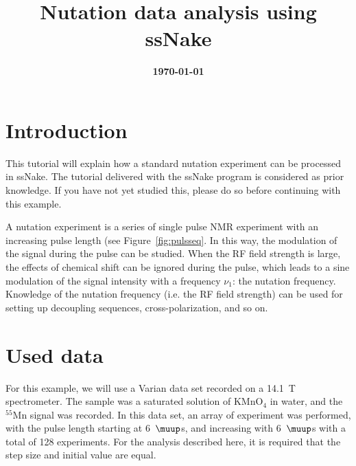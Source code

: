 \documentclass[11pt,a4paper]{article}
\title{\color{black}\fontfamily{SourceSansPro-LF}\bfseries Nutation data analysis using ssNake}
\date{\color{black}\fontfamily{SourceSansPro-LF}\bfseries \today}
\begin{document}


\maketitle

\section{Introduction}
This tutorial will explain how a standard nutation experiment can be processed in ssNake.
The tutorial delivered with the ssNake program is considered as prior knowledge.
If you have not yet studied this, please do so before continuing with this example.

A nutation experiment is a series of single pulse NMR experiment with an increasing pulse length (see Figure~\ref{fig:pulsseq}.
In this way, the modulation of the signal during the pulse can be studied.
When the RF field strength is large, the effects of chemical shift can be ignored during the pulse, which leads to a sine modulation of the signal intensity with a frequency $\nu_1$: the nutation frequency.
Knowledge of the nutation frequency (i.e. the RF field strength) can be used for setting up decoupling sequences, cross-polarization, and so on.

\begin{center}
\label{fig:pulsseq}
\end{center}




\section{Used data}
For this example, we will use a Varian data set recorded on a 14.1~T spectrometer.
The sample was a saturated solution of KMnO$_4$ in water, and the $^{55}$Mn signal was recorded.
In this data set, an array of experiment was performed, with the pulse length starting at 6~$\muup$s, and increasing with 6~$\muup$s with a total of 128 experiments.
For the analysis described here, it is required that the step size and initial value are equal.
\end{document}
